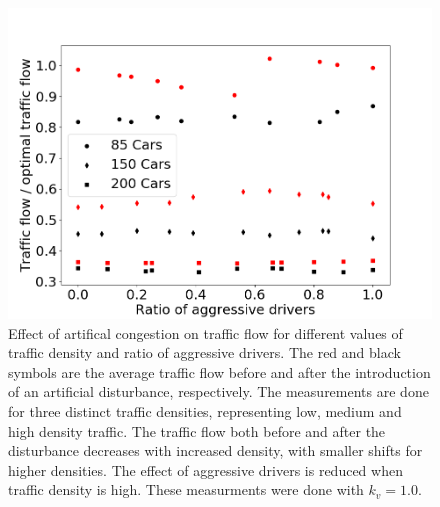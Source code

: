 \documentclass[11pt,a4paper,twocolumn]{article}
\begin{document}
\begin{figure}[ht]     
      \centering
       \includegraphics[scale=0.33]{figs/traffic_density_effect}
       \caption{Effect of artifical congestion on traffic flow for different values of traffic density and ratio of aggressive drivers. The red and black symbols are the average traffic flow before and after the introduction of an artificial disturbance, respectively. The measurements are done for three distinct traffic densities, representing low, medium and high density traffic. The traffic flow both before and after the disturbance decreases with increased density, with smaller shifts for higher densities. The effect of aggressive drivers is reduced  when traffic density is high. These measurments were done with $k_v=1.0$.}
       \label{fig:traffic_density}
 \end{figure}
 
\end{document}
